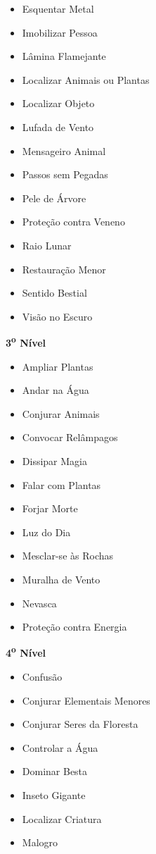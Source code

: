 \documentclass[a4paper,12p]{book}
\begin{document}
\begin{multicols}{4}
{\begin{itemize}
				\item Esquentar Metal
				\item Imobilizar Pessoa
				\item Lâmina Flamejante
				\item Localizar Animais ou Plantas
				\item Localizar Objeto
				\item Lufada de Vento
				\item Mensageiro Animal
				\item Passos sem Pegadas
				\item Pele de Árvore
				\item Proteção contra Veneno
				\item Raio Lunar
				\item Restauração Menor
				\item Sentido Bestial
				\item Visão no Escuro
			\end{itemize}
		\textbf{3\textsuperscript{o} Nível}
			\begin{itemize}
				\item Ampliar Plantas
				\item Andar na Água
				\item Conjurar Animais
				\item Convocar Relâmpagos
				\item Dissipar Magia
				\item Falar com Plantas
				\item Forjar Morte
				\item Luz do Dia
				\item Mesclar-se às Rochas
				\item Muralha de Vento
				\item Nevasca
				\item Proteção contra Energia
			\end{itemize}
		\columnbreak
		\textbf{4\textsuperscript{o} Nível}
			\begin{itemize}
				\item Confusão
				\item Conjurar Elementais Menores
				\item Conjurar Seres da Floresta
				\item Controlar a Água
				\item Dominar Besta
				\item Inseto Gigante
				\item Localizar Criatura
				\item Malogro

\end{itemize}}
\end{multicols}
\end{document}
